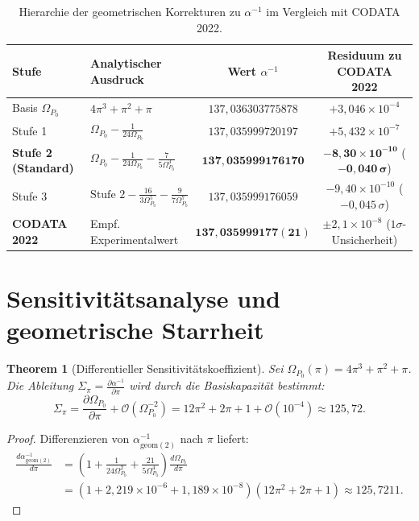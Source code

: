 \documentclass[11pt,a4paper]{article}
\newtheorem{theorem}{Theorem}[section]
\begin{document}
\begin{table}[htbp]
\centering
\footnotesize
\caption{Hierarchie der geometrischen Korrekturen zu $\alpha^{-1}$ im Vergleich mit CODATA 2022.}
\label{tab:alpha_hierarchy}
\vspace{0.15cm}
\begin{tabular}{@{}llcc@{}}
\toprule
\textbf{Stufe} & \textbf{Analytischer Ausdruck} & \textbf{Wert $\alpha^{-1}$} & \textbf{Residuum zu CODATA 2022} \\
\midrule
Basis $\Omega_{P_0}$ & $4\pi^3 + \pi^2 + \pi$ & $137{,}036303775878$ & $+3{,}046 \times 10^{-4}$ \\
Stufe 1 & $\Omega_{P_0} - \frac{1}{24\Omega_{P_0}}$ & $137{,}035999720197$ & $+5{,}432 \times 10^{-7}$ \\
\textbf{Stufe 2 (Standard)} & $\Omega_{P_0} - \frac{1}{24\Omega_{P_0}} - \frac{7}{5\Omega_{P_0}^3}$ & $\mathbf{137{,}035999176170}$ & $\mathbf{-8{,}30 \times 10^{-10}}$ ($\mathbf{-0{,}040\,\sigma}$) \\
Stufe 3 & $\text{Stufe 2} - \frac{16}{3\Omega_{P_0}^5} - \frac{9}{7\Omega_{P_0}^7}$ & $137{,}035999176059$ & $-9{,}40 \times 10^{-10}$ ($-0{,}045\,\sigma$) \\
\midrule
\textbf{CODATA 2022} & Empf. Experimentalwert & $\mathbf{137{,}035999177(21)}$ & $\pm 2{,}1 \times 10^{-8}$ ($1\sigma$-Unsicherheit) \\
\bottomrule
\end{tabular}
\end{table}

\section{Sensitivitätsanalyse und geometrische Starrheit}\label{sec:rigidity}

\begin{theorem}[Differentieller Sensitivitätskoeffizient]
Sei $\Omega_{P_0}(\pi) = 4\pi^3 + \pi^2 + \pi$. Die Ableitung $\Sigma_\pi = \frac{\partial \alpha^{-1}}{\partial \pi}$ wird durch die Basiskapazität bestimmt:
\begin{equation}
\Sigma_\pi = \frac{\partial \Omega_{P_0}}{\partial \pi} + \mathcal{O}(\Omega_{P_0}^{-2}) = 12\pi^2 + 2\pi + 1 + \mathcal{O}(10^{-4}) \approx 125{,}72.
\end{equation}
\end{theorem}

\begin{proof}
Differenzieren von $\alpha_{\text{geom}(2)}^{-1}$ nach $\pi$ liefert:
\begin{align}
\frac{d \alpha_{\text{geom}(2)}^{-1}}{d\pi} &= \left(1 + \frac{1}{24\Omega_{P_0}^2} + \frac{21}{5\Omega_{P_0}^4}\right) \frac{d\Omega_{P_0}}{d\pi} \\
&= \left(1 + 2{,}219 \times 10^{-6} + 1{,}189 \times 10^{-8}\right) (12\pi^2 + 2\pi + 1) \approx 125{,}7211.
\end{align}
\end{proof}
\end{document}
